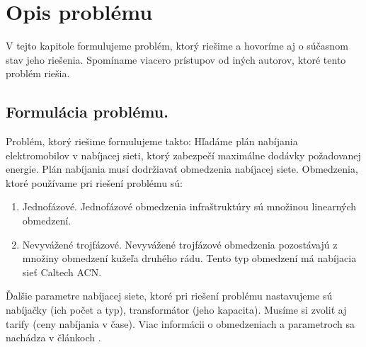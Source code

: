 
% 

\chapter{Opis problému}

V tejto kapitole formulujeme problém, ktorý riešime a hovoríme aj o súčasnom stav jeho riešenia. Spomíname viacero prístupov od iných autorov, ktoré tento problém riešia.


\section{Formulácia problému.}
Problém, ktorý riešime formulujeme takto:
Hľadáme plán nabíjania elektromobilov v nabíjacej sieti, ktorý zabezpečí maximálne dodávky požadovanej energie. Plán nabíjania musí dodržiavať obmedzenia nabíjacej siete. Obmedzenia, ktoré používame pri riešení problému sú:
\begin{enumerate}
    \item Jednofázové. Jednofázové obmedzenia infraštruktúry sú množinou linearných obmedzení. 
    \item Nevyvážené trojfázové. Nevyvážené trojfázové obmedzenia pozostávajú z množiny obmedzení kužeľa druhého rádu. Tento typ obmedzení má nabíjacia sieť Caltech ACN.
\end{enumerate}
Ďalšie parametre nabíjacej siete, ktoré pri riešení problému nastavujeme sú nabíjačky (ich počet a typ), transformátor (jeho kapacita). Musíme si zvoliť aj tarify (ceny nabíjania v čase). Viac informácii o obmedzeniach a parametroch sa nachádza v článkoch \cite{lee2021acnsim,Lee2018LargeScaleAE}.


